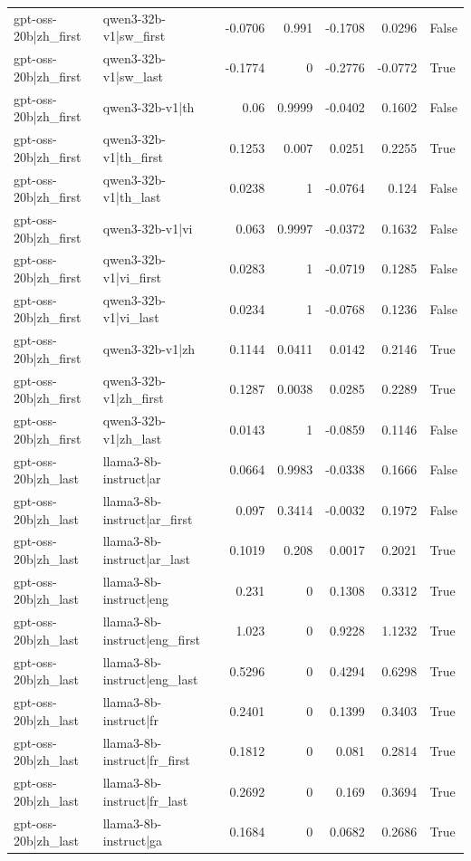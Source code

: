 \begin{table}
\begin{tabular}{l l r r r r l}
gpt-oss-20b|zh_first & qwen3-32b-v1|sw_first & -0.0706 & 0.991 & -0.1708 & 0.0296 & False \\
gpt-oss-20b|zh_first & qwen3-32b-v1|sw_last & -0.1774 & 0 & -0.2776 & -0.0772 & True \\
gpt-oss-20b|zh_first & qwen3-32b-v1|th & 0.06 & 0.9999 & -0.0402 & 0.1602 & False \\
gpt-oss-20b|zh_first & qwen3-32b-v1|th_first & 0.1253 & 0.007 & 0.0251 & 0.2255 & True \\
gpt-oss-20b|zh_first & qwen3-32b-v1|th_last & 0.0238 & 1 & -0.0764 & 0.124 & False \\
gpt-oss-20b|zh_first & qwen3-32b-v1|vi & 0.063 & 0.9997 & -0.0372 & 0.1632 & False \\
gpt-oss-20b|zh_first & qwen3-32b-v1|vi_first & 0.0283 & 1 & -0.0719 & 0.1285 & False \\
gpt-oss-20b|zh_first & qwen3-32b-v1|vi_last & 0.0234 & 1 & -0.0768 & 0.1236 & False \\
gpt-oss-20b|zh_first & qwen3-32b-v1|zh & 0.1144 & 0.0411 & 0.0142 & 0.2146 & True \\
gpt-oss-20b|zh_first & qwen3-32b-v1|zh_first & 0.1287 & 0.0038 & 0.0285 & 0.2289 & True \\
gpt-oss-20b|zh_first & qwen3-32b-v1|zh_last & 0.0143 & 1 & -0.0859 & 0.1146 & False \\
gpt-oss-20b|zh_last & llama3-8b-instruct|ar & 0.0664 & 0.9983 & -0.0338 & 0.1666 & False \\
gpt-oss-20b|zh_last & llama3-8b-instruct|ar_first & 0.097 & 0.3414 & -0.0032 & 0.1972 & False \\
gpt-oss-20b|zh_last & llama3-8b-instruct|ar_last & 0.1019 & 0.208 & 0.0017 & 0.2021 & True \\
gpt-oss-20b|zh_last & llama3-8b-instruct|eng & 0.231 & 0 & 0.1308 & 0.3312 & True \\
gpt-oss-20b|zh_last & llama3-8b-instruct|eng_first & 1.023 & 0 & 0.9228 & 1.1232 & True \\
gpt-oss-20b|zh_last & llama3-8b-instruct|eng_last & 0.5296 & 0 & 0.4294 & 0.6298 & True \\
gpt-oss-20b|zh_last & llama3-8b-instruct|fr & 0.2401 & 0 & 0.1399 & 0.3403 & True \\
gpt-oss-20b|zh_last & llama3-8b-instruct|fr_first & 0.1812 & 0 & 0.081 & 0.2814 & True \\
gpt-oss-20b|zh_last & llama3-8b-instruct|fr_last & 0.2692 & 0 & 0.169 & 0.3694 & True \\
gpt-oss-20b|zh_last & llama3-8b-instruct|ga & 0.1684 & 0 & 0.0682 & 0.2686 & True \\

\end{tabular}
\end{table}
